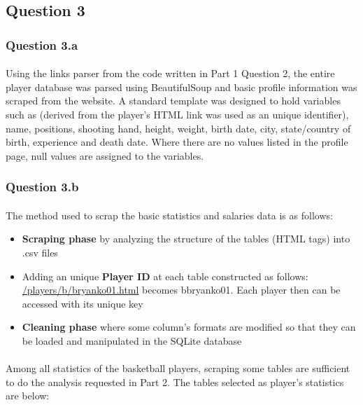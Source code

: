 
\subsection{Question 3}
\label{subsec:313}

\subsubsection{Question 3.a}
\label{subsubsec:313a}
\paragraph{}Using the links parser from the code written in Part 1 Question 2, the entire player database was parsed using BeautifulSoup and basic profile information was scraped from the website. A standard template was designed to hold variables such as  (derived from the player’s HTML link was used as an unique identifier), name, positions, shooting hand, height, weight, birth date, city, state/country of birth, experience and death date. Where there are no values listed in the profile page, null values are assigned to the variables.

\subsubsection{Question 3.b}
\label{subsubsec:313b}

\paragraph{}The method used to scrap the basic statistics and salaries data is as follows:

\begin{itemize}
	\item \textbf{Scraping phase} by analyzing the structure of the tables (HTML tags) into .csv files
	\item Adding an unique \textbf{Player ID} at each table constructed as follows: \url{/players/b/bryanko01.html} becomes bbryanko01. Each player then can be accessed with its unique key
	\item \textbf{Cleaning phase} where some column's formats are modified so that they can be loaded and manipulated in the SQLite database
\end{itemize}

\paragraph{}Among all statistics of the basketball players, scraping some tables are sufficient to do the analysis requested in Part 2. The tables selected as player's statistics are below:

